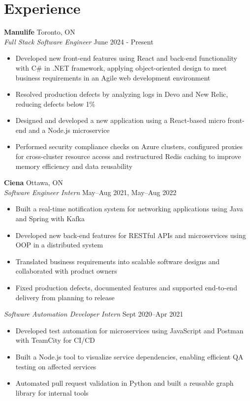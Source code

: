 \documentclass[a4paper,10pt]{article}
\begin{document}
\vspace{0.2em}

\section*{Experience}

\textbf{Manulife} \hfill Toronto, ON \\
\textit{Full Stack Software Engineer} \hfill June 2024 - Present
\begin{itemize}[itemsep=2pt]
    \item Developed new front-end features using React and back-end functionality with C\# in .NET framework, applying object-oriented design to meet business requirements in an Agile web development environment
    \item Resolved production defects by analyzing logs in Devo and New Relic, reducing defects below 1\%
    \item Designed and developed a new application using a React-based micro front-end and a Node.js microservice
    \item Performed security compliance checks on Azure clusters, configured proxies for cross-cluster resource access and restructured Redis caching to improve memory efficiency and data reusability
\end{itemize}

\textbf{Ciena} \hfill Ottawa, ON \\
\textit{Software Engineer Intern} \hfill May–Aug 2021, May–Aug 2022
\begin{itemize}[itemsep=2pt]
    \item Built a real-time notification system for networking applications using Java and Spring with Kafka
    \item Developed new back-end features for RESTful APIs and microservices using OOP in a distributed system
    \item Translated business requirements into scalable software designs and collaborated with product owners
    \item Fixed production defects, documented features and supported end-to-end delivery from planning to release
\end{itemize}

\textit{Software Automation Developer Intern} \hfill Sept 2020–Apr 2021
\begin{itemize}[itemsep=2pt]
    \item Developed test automation for microservices using JavaScript and Postman with TeamCity for CI/CD
    \item Built a Node.js tool to visualize service dependencies, enabling efficient QA testing on affected services
    \item Automated pull request validation in Python and built a reusable graph library for internal tools
\end{itemize}
\end{document}
